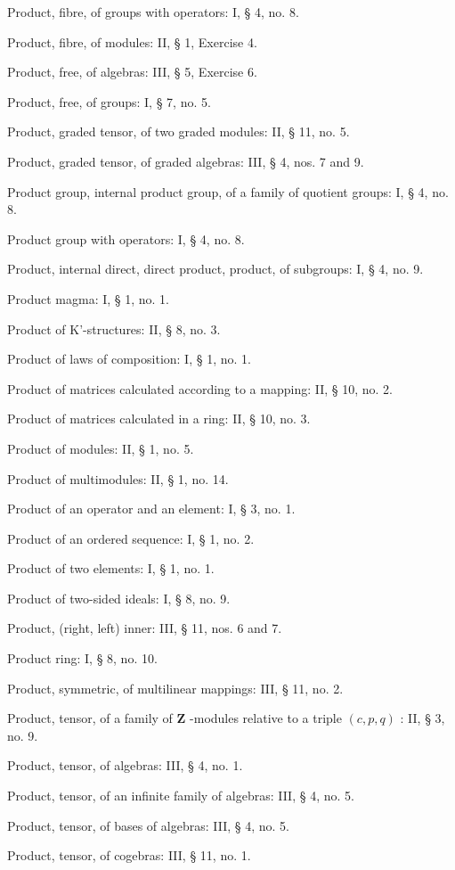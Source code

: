 Product, fibre, of groups with operators: I, § 4, no. 8.

Product, fibre, of modules: II, § 1, Exercise 4.

Product, free, of algebras: III, § 5, Exercise 6.

Product, free, of groups: I, § 7, no. 5.

Product, graded tensor, of two graded modules: II, § 11, no. 5.

Product, graded tensor, of graded algebras: III, § 4, nos. 7 and 9.

Product group, internal product group, of a family of quotient groups: I, § 4, no. 8.

Product group with operators: I, § 4, no. 8.

Product, internal direct, direct product, product, of subgroups: I, § 4, no. 9.

Product magma: I, § 1, no. 1.

Product of K'-structures: II, § 8, no. 3.

Product of laws of composition: I, § 1, no. 1.

Product of matrices calculated according to a mapping: II, § 10, no. 2.

Product of matrices calculated in a ring: II, § 10, no. 3.

Product of modules: II, § 1, no. 5.

Product of multimodules: II, § 1, no. 14.

Product of an operator and an element: I, § 3, no. 1.

Product of an ordered sequence: I, § 1, no. 2.

Product of two elements: I, § 1, no. 1.

Product of two-sided ideals: I, § 8, no. 9.

Product, (right, left) inner: III, § 11, nos. 6 and 7.

Product ring: I, § 8, no. 10.

Product, symmetric, of multilinear mappings: III, § 11, no. 2.

Product, tensor, of a family of \(\mathbf{Z}\) -modules relative to a triple \((c, p, q)\) : II, § 3, no. 9.

Product, tensor, of algebras: III, § 4, no. 1.

Product, tensor, of an infinite family of algebras: III, § 4, no. 5.

Product, tensor, of bases of algebras: III, § 4, no. 5.

Product, tensor, of cogebras: III, § 11, no. 1.

